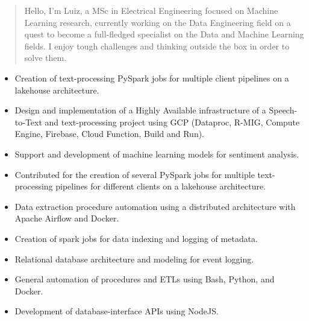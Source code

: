 \documentclass[10pt,a4paper,ragged2e,withhyper]{altacv}
\begin{document}
\begin{paracol}{2}
        \newpage
        
        \switchcolumn
        
            \begin{quote}
                Hello, I'm Luiz, a MSc in Electrical Engineering focused on Machine Learning research, currently working 
                on the Data Engineering field on a quest to become a full-fledged specialist on the Data and Machine Learning fields. I enjoy tough challenges and thinking outside the box in order to solve them. 
                
            \end{quote}
        
            \begin{itemize}
                \item Creation of text-processing PySpark jobs for multiple client pipelines on a lakehouse architecture.
                \item Design and implementation of a Highly Available infrastructure of a Speech-to-Text and text-processing 
                project using GCP (Dataproc, R-MIG, Compute Engine, Firebase, Cloud Function, Build and Run).
                \item Support and development of machine learning models for sentiment analysis.
                \item Contributed for the creation of several PySpark jobs for multiple text-processing pipelines for 
                different clients on a lakehouse architecture.
            \end{itemize}
            \divider
            
            \begin{itemize}
                \item Data extraction procedure automation using a distributed architecture with Apache Airflow and Docker.
                \item Creation of spark jobs for data indexing and logging of metadata.
                \item Relational database architecture and modeling for event logging.
                \item General automation of procedures and ETLs using Bash, Python, and Docker.
                \item Development of database-interface APIs using NodeJS.
            \end{itemize}
            \divider
            

\end{paracol}
\end{document}
